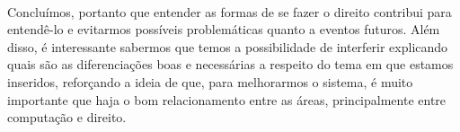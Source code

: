 \documentclass[12pt]{article}
\begin{document}
	\paragraph{}
		Concluímos, portanto que entender as formas de se fazer o direito
		contribui para entendê-lo e evitarmos possíveis problemáticas quanto
		a eventos futuros. Além disso, é interessante sabermos que temos
		a possibilidade de interferir explicando quais são as diferenciações
		boas e necessárias a respeito do tema em que estamos inseridos,
		reforçando a ideia de que, para melhorarmos o sistema, é muito
		importante que haja o bom relacionamento entre as áreas,
		principalmente entre computação e direito.
\end{document}
